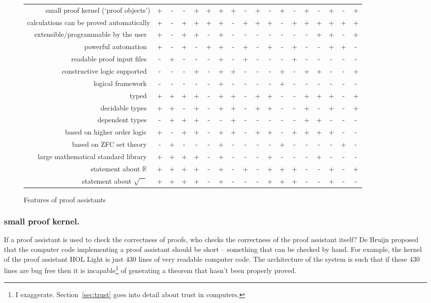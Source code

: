 \documentclass{llncs}
\newcommand{\ring}[1]{\mathbb{#1}}
\begin{document}
\begin{figure}
\begin{tabular}{|r|ccccc|ccccc|ccccc|cc|}
\hline
small proof kernel (`proof objects')
&+ &- &- &+  &+ &+ &+ &-  &+ &- &+ &-  &+ &- &+ &-  &+ 
\\
calculations can be proved automatically
&+ &- &+ &+  &+ &+ &- &+  &+ &+ &- &+  &+ &+ &+ &+  &+ 
\\
extensible/programmable by the user~
&+ &- &+ &+  &- &+ &- &-  &- &- &- &-  &- &+ &+ &-  &+ 
\\
powerful automation~
&+ &- &+ &-  &+ &+ &- &+  &- &+ &- &+  &- &- &+ &+  &- 
\\
readable proof input files~
&- &+ &- &-  &- &+ &- &+  &- &- &- &+  &- &- &- &-  &- 
\\
\hline
constructive logic supported~
&- &- &- &+  &- &+ &+ &-  &- &- &+ &-  &+ &+ &- &-  &+ 
\\
logical framework~
&- &- &- &-  &- &+ &- &-  &- &- &+ &-  &- &- &- &-  &- 
\\
typed~
&+ &+ &+ &+  &- &+ &+ &-  &+ &+ &- &-  &+ &+ &+ &-  &+ 
\\
decidable types~
&+ &+ &- &+  &- &+ &+ &-  &+ &+ &- &-  &+ &- &+ &-  &+ 
\\
dependent types~
&- &+ &+ &+  &- &- &+ &-  &- &- &- &-  &+ &+ &- &-  &- 
\\
\hline
based on higher order logic~
&+ &- &+ &+  &- &+ &+ &-  &+ &+ &- &+  &+ &+ &+ &-  &- 
\\
based on ZFC set theory~
&- &+ &- &-  &- &+ &- &-  &- &- &+ &-  &- &- &- &+  &- 
\\
large mathematical standard library~
&+ &+ &+ &+  &- &+ &- &-  &- &+ &- &-  &- &+ &- &-  &- 
\\
statement about $\ring{R}$~
&+ &+ &+ &+  &- &+ &- &+  &- &+ &+ &+  &- &- &+ &-  &+ 
\\
statement about $\sqrt{\phantom X}$~
&+ &+ &+ &+  &- &+ &- &-  &- &+ &+ &+  &- &- &+ &-  &- 
\\
\hline
\end{tabular}
\caption{Features of proof assistants~\cite{wiedijk:17}}
\label{fig:feature}
\end{figure}
\bigskip 

\subsubsection{small proof kernel.} If a proof assistant is used to
check the correctness of proofs, who checks the correctness of the
proof assistant itself?  De Bruijn proposed that the computer code
implementing a proof assistant should be short -- something that can
be checked by hand.  For example, the kernel of the proof assistant
HOL Light is just $430$ lines of very readable computer code.  The
architecture of the system is such that if these $430$ lines are bug
free then it is incapable\footnote{I
  exaggerate. Section~\ref{sec:trust} goes into detail about trust in
  computers.} of generating a theorem that hasn't been properly
proved.
\end{document}
